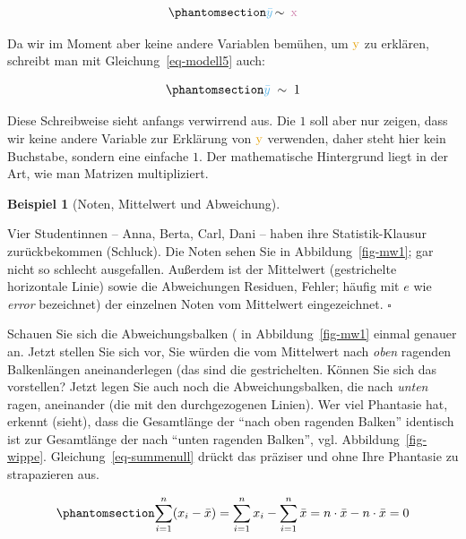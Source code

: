 \documentclass[
  letterpaper,
  twoside,
  open=any]{scrbook}
\theoremstyle{definition}
\theoremstyle{definition}
\theoremstyle{definition}
\newtheorem{example}{Beispiel}[chapter]
\theoremstyle{remark}
\begin{document}
\begin{equation}\phantomsection\label{eq-modell5a}{\color{modelcol}{\bar{y}} \color{black}  {\, \sim \,} \color{xcol}{\text{ x}}}\end{equation}

Da wir im Moment aber keine andere Variablen bemühen, um
\(\color{ycol}{\text{y}}\) zu erklären, schreibt man mit
Gleichung~\ref{eq-modell5} auch:

\begin{equation}\phantomsection\label{eq-modell5}{\color{modelcol}{\bar{y}}\;\;  \color{black}{\sim \; 1}}\end{equation}

Diese Schreibweise sieht anfangs verwirrend aus. Die \(1\) soll aber nur
zeigen, dass wir keine andere Variable zur Erklärung von
\(\color{ycol}{\text{y}}\) verwenden, daher steht hier kein Buchstabe,
sondern eine einfache \(1\). Der mathematische Hintergrund liegt in der
Art, wie man Matrizen multipliziert.

\begin{example}[Noten, Mittelwert und
Abweichung]\protect\hypertarget{exm-noten}{}\label{exm-noten}

Vier Studentinnen -- Anna, Berta, Carl, Dani -- haben ihre
Statistik-Klausur zurückbekommen (Schluck). Die Noten sehen Sie in
Abbildung~\ref{fig-mw1}; gar nicht so schlecht ausgefallen. Außerdem ist
der Mittelwert (gestrichelte horizontale Linie) sowie die Abweichungen
Residuen, Fehler; häufig mit \(e\) wie \emph{error} bezeichnet) der
einzelnen Noten vom Mittelwert eingezeichnet. \(\square\)

\end{example}

Schauen Sie sich die Abweichungsbalken ( in Abbildung~\ref{fig-mw1}
einmal genauer an. Jetzt stellen Sie sich vor, Sie würden die vom
Mittelwert nach \emph{oben} ragenden Balkenlängen aneinanderlegen (das
sind die gestrichelten. Können Sie sich das vorstellen? Jetzt legen Sie
auch noch die Abweichungsbalken, die nach \emph{unten} ragen, aneinander
(die mit den durchgezogenen Linien). Wer viel Phantasie hat, erkennt
(sieht), dass die Gesamtlänge der \enquote{nach oben ragenden Balken}
identisch ist zur Gesamtlänge der nach \enquote{unten ragenden Balken},
vgl. Abbildung~\ref{fig-wippe}. Gleichung~\ref{eq-summenull} drückt das
präziser und ohne Ihre Phantasie zu strapazieren aus.

\begin{equation}\phantomsection\label{eq-summenull}{\sum_{i=1}^n (x_i-\bar{x})=\sum_{i=1}^n x_i - \sum_{i=1}^n \bar{x} = n\cdot \bar{x} - n\cdot \bar{x}=0}\end{equation}
\end{document}
